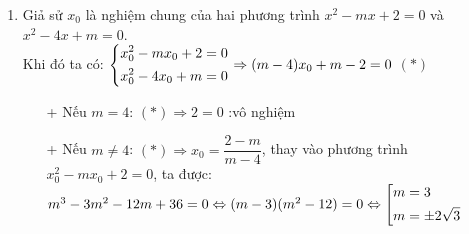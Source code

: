 \begin{ex}
{\begin{enumerate}
{}
    	Lấy $A'$ đối xứng với $A$ qua $Oy\Rightarrow A'\left(-1;\dfrac{1}{2}\right)$. Theo tính chất đối xứng, ta có: $CA'=CA$\\
    	Suy ra: $CA+CB=CA'+CB\geq A'B$ (không đổi)
    	\begin{align*}
    	CA+CB \text{nhỏ nhất} 
    	&\Leftrightarrow CA'+CB=A'B\\
    	&\Leftrightarrow A',C,B \text{ thẳng hàng và } C\in Oy\\
    	&\Leftrightarrow C\text{ là giao điểm của đường thẳng} A'B \text{ và trục } Oy
    	\end{align*}
    	Phương trình đường thẳng $A'B$ có dạng $y=ax+b\Rightarrow \heva{-a+b&=\dfrac{1}{2}\\3a+b&=\dfrac{9}{2}}\Leftrightarrow \heva{a=1\\b=\dfrac{3}{2}}$\\
    		Suy ra $A'B: y=x+\dfrac{3}{2}$\\
    		Tọa độ giao điểm $C$ của hai đường thẳng $A'B$ và $Oy$ là nghiệm của hệ phương trình: \\
    		$\heva{&x=0\\&y=x+\dfrac{3}{2}}\Leftrightarrow \heva{&x=0\\&y=\dfrac{3}{2}}$\\
    		Vậy khi $C\left(0;\dfrac{3}{2}\right)$ thì tổng khoảng cách $(BC+CA)$ nhỏ nhất
         \item Giả sử $x_0$ là nghiệm chung của hai phương trình  $x^2-mx+2=0$ và $x^2-4x+m=0$.\\
         Khi đó ta có: $\left\{\begin{aligned}&x^2_0-mx_0+2=0\\&x^2_0-4x_0+m=0\end{aligned}\right.\Rightarrow (m-4)x_0+m-2=0$  $(*)$\\
         \begin{itemize}
         	\item[+] Nếu $m=4$: $(*)\Rightarrow 2=0$ :vô nghiệm
         	\item[+] Nếu $m\neq 4$: $(*)\Rightarrow x_0=\dfrac{2-m}{m-4}$, thay vào phương trình $x^2_0-mx_0+2=0$, ta được: \\
         	$m^3-3m^2-12m+36=0\Leftrightarrow (m-3)(m^2-12)=0\Leftrightarrow \left[\begin{aligned}&m=3\\&m=\pm 2\sqrt{3}\end{aligned}\right.$
         \end{itemize}
     \begin{itemize}

\end{itemize}
\end{enumerate}}
\end{ex}
